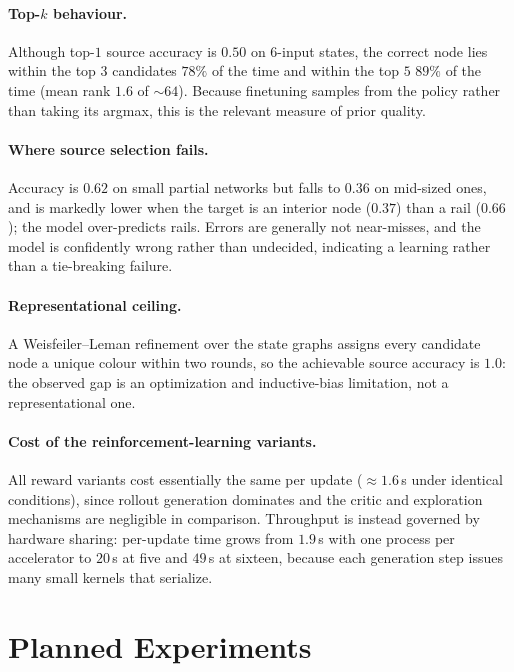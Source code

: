 \documentclass[11pt, a4paper]{article}
\theoremstyle{plain}
\theoremstyle{definition}
\theoremstyle{remark}
\begin{document}
\paragraph{Top-$k$ behaviour.}
Although top-$1$ source accuracy is $0.50$ on $6$-input states, the
correct node lies within the top $3$ candidates $78\%$ of the time and
within the top $5$ $89\%$ of the time (mean rank $1.6$ of ${\sim}64$).
Because finetuning samples from the policy rather than taking its argmax,
this is the relevant measure of prior quality.

\paragraph{Where source selection fails.}
Accuracy is $0.62$ on small partial networks but falls to $0.36$ on
mid-sized ones, and is markedly lower when the target is an interior node
($0.37$) than a rail ($0.66$); the model over-predicts rails.  Errors are
generally not near-misses, and the model is confidently wrong rather than
undecided, indicating a learning rather than a tie-breaking failure.

\paragraph{Representational ceiling.}
A Weisfeiler--Leman refinement over the state graphs assigns every
candidate node a unique colour within two rounds, so the achievable
source accuracy is $1.0$: the observed gap is an optimization and
inductive-bias limitation, not a representational one.

\paragraph{Cost of the reinforcement-learning variants.}
All reward variants cost essentially the same per update
($\approx 1.6$\,s under identical conditions), since rollout generation
dominates and the critic and exploration mechanisms are negligible in
comparison.  Throughput is instead governed by hardware sharing:
per-update time grows from $1.9$\,s with one process per accelerator to
$20$\,s at five and $49$\,s at sixteen, because each generation step
issues many small kernels that serialize.

\section{Planned Experiments}
\label{sec:planned}
\end{document}

